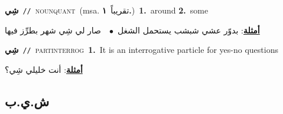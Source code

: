 \documentclass[10pt,a4paper,twoside]{article} %
\begin{document}
\begin{multicols}{2}
{\setlength\topsep{0pt}\textbf{\foreignlanguage{arabic}{شِي}}\ {\color{gray}\texttt{//}\color{black}}\ \textsc{noun\textunderscore quant}\ \color{gray}(msa. \foreignlanguage{arabic}{تقريباً}~\foreignlanguage{arabic}{\textbf{١.}})\color{black}\ \textbf{1.}~around  \textbf{2.}~some\  \begin{flushright}\color{gray}\foreignlanguage{arabic}{\textbf{\underline{\foreignlanguage{arabic}{أمثلة}}}:  بدوّر عشي شبشب يستحمل الشغل\ $\bullet$\ \  صار لي شِي شهر بطرِّز فيها}\end{flushright}\color{black}} \vspace{2mm}

{\setlength\topsep{0pt}\textbf{\foreignlanguage{arabic}{شِي}}\ {\color{gray}\texttt{//}\color{black}}\ \textsc{part\textunderscore interrog}\ \textbf{1.}~It is an interrogative particle for yes-no questions\  \begin{flushright}\color{gray}\foreignlanguage{arabic}{\textbf{\underline{\foreignlanguage{arabic}{أمثلة}}}: أنت خليلي شِي؟}\end{flushright}\color{black}} \vspace{2mm}

\vspace{-3mm}
\subsection*{\color{blue}\foreignlanguage{arabic}{ش.ي.ب}\color{blue}{}} 


\end{multicols}
\end{document}
